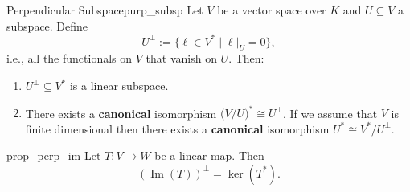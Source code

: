 \begin{proposition}{Perpendicular Subspace}{purp_subsp}
	Let $V$ be a vector space over $K$ and $U \subseteq V$ a subspace. Define
	\[
		U^{\perp} := \bigl\{\ell \in V^* \;|\; \ell |_{U} = 0\bigr\},
	\]
	i.e., all the functionals on $V$ that vanish on $U$. Then:
	\begin{enumerate}
		\item $U^{\perp} \subseteq V^*$ is a linear subspace.
		\item There exists a \textbf{canonical} isomorphism $\big(V/U\big)^* \cong U^{\perp}$. If we assume that $V$ is finite dimensional then there exists a \textbf{canonical} isomorphism $U^* \cong V^*/U^{\perp}$.
	\end{enumerate}
\end{proposition}

\begin{proposition}{}{prop_perp_im}
	Let $T:V \to W$ be a linear map. Then
	\[
		(\operatorname{Im}(T))^{\perp} = \ker(T^*).
	\]
\end{proposition}




